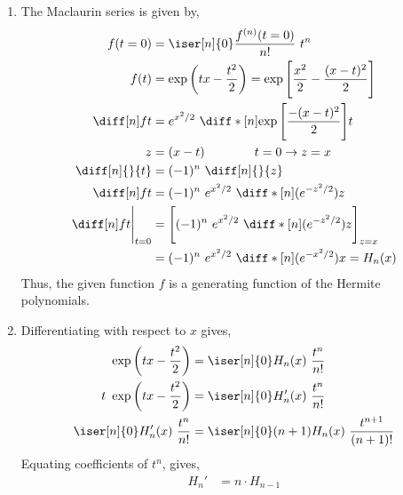 \begin{enumerate}
\begin{enumerate}
              \item The Maclaurin series is given by,
                    \begin{align}
                        f(t = 0)                 & = \iser[n]{0}
                        \frac{f^{(n)}(t=0)}{n!}\ t^n                               \\
                        f(t)                     & = \exp\left( tx - \frac{t^2}{2}
                        \right)
                        = \exp \Bigg[\frac{x^2}{2} - \frac{(x-t)^2}{2}\Bigg]       \\
                        \diff[n] ft              & = e^{x^2/2}\ \diff*[n]
                        {\exp\Bigg[\frac{-(x-t)^2}{2}\Bigg]}{t}                    \\
                        z                        & = (x-t)   \qquad\qquad
                        t = 0 \to z = x                                            \\
                        \diff[n]{}{t}            & = (-1)^n\ \diff[n]{}{z}         \\
                        \diff[n] ft              & = (-1)^n\ e^{x^2/2}
                        \ \diff*[n]{(e^{-z^2/2})}{z}                               \\
                        \diff[n] ft \Bigg|_{t=0} & = \Bigg[(-1)^n\ e^{x^2/2}
                        \ \diff*[n]{(e^{-z^2/2})}{z}\Bigg]_{z=x}                   \\
                                                 & = (-1)^n\ e^{x^2/2}
                        \ \diff*[n]{(e^{-x^2/2})}{x} = H_n(x)
                    \end{align}
                    Thus, the given function $ f $ is a generating function of the
                    Hermite polynomials.

              \item Differentiating with respect to $ x $ gives,
                    \begin{align}
                        \exp\left( tx - \frac{t^2}{2} \right)    & = \iser[n]{0}
                        H_n(x)\ \frac{t^n}{n!}                                   \\
                        t\ \exp\left( tx - \frac{t^2}{2} \right) & = \iser[n]{0}
                        H_n'(x)\ \frac{t^n}{n!}                                  \\
                        \iser[n]{0} H_n'(x)\ \frac{t^{n}}{n!}    & = \iser[n]{0}
                        (n+1)H_n(x)\ \frac{t^{n+1}}{(n+1)!}
                    \end{align}
                    Equating coefficients of $ t^n $, gives,
                    \begin{align}
                        H_n' & = n \cdot H_{n-1}
                    \end{align}


\end{enumerate}
\end{enumerate}
